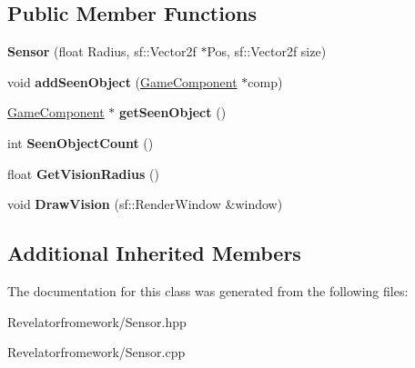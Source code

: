 \subsection*{Public Member Functions}
\begin{DoxyCompactItemize}
\item 
\hypertarget{class_sensor_ac404bb7c1045796220e6d2997231feec}{{\bfseries Sensor} (float Radius, sf\-::\-Vector2f $\ast$Pos, sf\-::\-Vector2f size)}\label{class_sensor_ac404bb7c1045796220e6d2997231feec}

\item 
\hypertarget{class_sensor_a10dcb96d63d3991eff95b47f626d0e4c}{void {\bfseries add\-Seen\-Object} (\hyperlink{class_game_component}{Game\-Component} $\ast$comp)}\label{class_sensor_a10dcb96d63d3991eff95b47f626d0e4c}

\item 
\hypertarget{class_sensor_ac707ee7af9bd9adcdcb17d126582cc14}{\hyperlink{class_game_component}{Game\-Component} $\ast$ {\bfseries get\-Seen\-Object} ()}\label{class_sensor_ac707ee7af9bd9adcdcb17d126582cc14}

\item 
\hypertarget{class_sensor_ade01c8ff6de8daec5755b39bf4a57eae}{int {\bfseries Seen\-Object\-Count} ()}\label{class_sensor_ade01c8ff6de8daec5755b39bf4a57eae}

\item 
\hypertarget{class_sensor_ab7cc277606b8709a6df5fc53d7c0f22b}{float {\bfseries Get\-Vision\-Radius} ()}\label{class_sensor_ab7cc277606b8709a6df5fc53d7c0f22b}

\item 
\hypertarget{class_sensor_a8ed4309852c92cdeac0152cc2f604ac8}{void {\bfseries Draw\-Vision} (sf\-::\-Render\-Window \&window)}\label{class_sensor_a8ed4309852c92cdeac0152cc2f604ac8}

\end{DoxyCompactItemize}
\subsection*{Additional Inherited Members}


The documentation for this class was generated from the following files\-:\begin{DoxyCompactItemize}
\item 
Revelatorfromework/Sensor.\-hpp\item 
Revelatorfromework/Sensor.\-cpp\end{DoxyCompactItemize}
